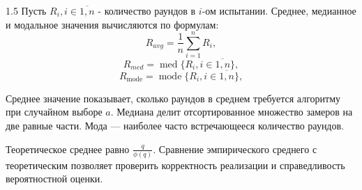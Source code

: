 \documentclass[14pt,a4paper]{extarticle}
\begin{document}
\begin{spacing}{1.5}
Пусть \(R_i, i \in \overline{1, n}\) - количество раундов в \(i\)-ом испытании. Среднее, медианное и модальное значения вычисляются по формулам:
\begin{equation}\tag{1.9}
    R_{avg} = \frac{1}{n} \sum_{i=1}^{n} R_i,
\end{equation}
\begin{equation}\tag{1.10}
    R_{med} = \operatorname{med}\{R_i, i \in \overline{1, n}\},
\end{equation}
\begin{equation}\tag{1.11}
    R_{\text{mode}} = \operatorname{mode}\{R_i, i \in \overline{1, n}\},
\end{equation}

Среднее значение показывает, сколько раундов в среднем требуется алгоритму при случайном выборе \(a\). Медиана делит отсортированное множество замеров на две равные части. Мода — наиболее часто встречающееся количество раундов.

Теоретическое среднее равно \(\frac{q}{\phi(q)}\). Сравнение эмпирического среднего с теоретическим позволяет проверить корректность реализации и справедливость вероятностной оценки.
\end{spacing}

\newpage
\end{document}
